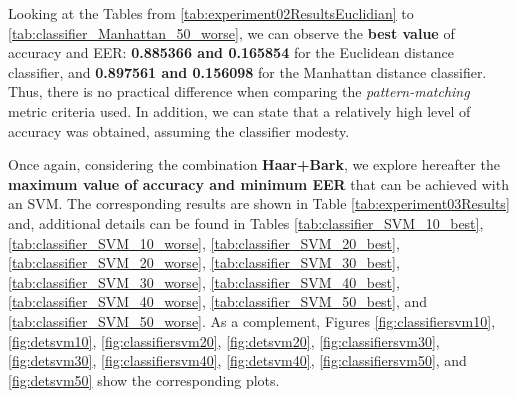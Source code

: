 \par Looking at the Tables from \ref{tab:experiment02ResultsEuclidian} to \ref{tab:classifier_Manhattan_50_worse}, we can observe the \textbf{best value} of accuracy and EER: \textbf{0.885366 and 0.165854} for the Euclidean distance classifier, and \textbf{0.897561 and 0.156098} for the Manhattan distance classifier. Thus, there is no practical difference when comparing the \textit{pattern-matching} metric criteria used. In addition, we can state that a relatively high level of accuracy was obtained, assuming the classifier modesty.
\\
\par Once again, considering the combination \textbf{Haar+Bark}, we explore hereafter the \textbf{maximum value of accuracy and minimum EER} that can be achieved with an SVM. The corresponding results are shown in Table \ref{tab:experiment03Results} and, additional details can be found in Tables \ref{tab:classifier_SVM_10_best}, \ref{tab:classifier_SVM_10_worse}, \ref{tab:classifier_SVM_20_best}, \ref{tab:classifier_SVM_20_worse}, \ref{tab:classifier_SVM_30_best}, \ref{tab:classifier_SVM_30_worse}, \ref{tab:classifier_SVM_40_best}, \ref{tab:classifier_SVM_40_worse}, \ref{tab:classifier_SVM_50_best}, and \ref{tab:classifier_SVM_50_worse}. As a complement, Figures \ref{fig:classifiersvm10}, \ref{fig:detsvm10}, \ref{fig:classifiersvm20}, \ref{fig:detsvm20}, \ref{fig:classifiersvm30}, \ref{fig:detsvm30}, \ref{fig:classifiersvm40}, \ref{fig:detsvm40}, \ref{fig:classifiersvm50}, and \ref{fig:detsvm50} show the corresponding plots.\\


